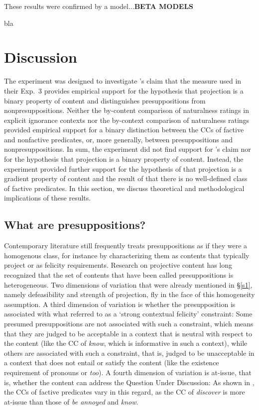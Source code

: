 \documentclass[11pt,fleqn]{article}
\newcommand{\6}{\mbox{$[\hspace*{-.6mm}[$}}
\newcommand{\9}{\mbox{$]\hspace*{-.6mm}]$}}
\newcommand{\citepos}[1]{\citeauthor{#1}'s \citeyear{#1}}
\begin{document}
These results were confirmed by a model...{\bf BETA MODELS}

\newpage

bla

\newpage

\section{Discussion}\label{s3}

The experiment was designed to investigate \citepos{mandelkern-etal2020} claim that the measure used in their Exp.~3 provides empirical support for the hypothesis that projection is a binary property of content and distinguishes presuppositions from nonpresuppositions. Neither the by-content comparison of naturalness ratings in explicit ignorance contexts nor the by-context comparison of naturalness ratings provided empirical support for a binary distinction between the CCs of factive and nonfactive predicates, or, more generally, between presuppositions and nonpresuppositions. In sum, the experiment did not find support for \citepos{mandelkern-etal2020} claim nor for the hypothesis that projection is a binary property of content. Instead, the experiment provided further support for the hypothesis of \citealt{tbd-variability} that projection is a gradient property of content and the result of \citealt{degen-tonhauser-language} that there is no well-defined class of factive predicates. In this section, we discuss theoretical and methodological implications of these results.

\subsection{What are presuppositions?}

Contemporary literature still frequently treats presuppositions as if they were a homogenous class, for instance by characterizing them as contents that typically project or as felicity requirements. Research on projective content has long recognized that the set of contents that have been called presuppositions is heterogeneous. Two dimensions of variation that were already mentioned in \S\ref{s1}, namely defeasibility and strength of projection, fly in the face of this homogeneity assumption.  A third dimension of variation is whether the presupposition is associated with what \citealt{brst-lang11} referred to as a `strong contextual felicity' constraint: Some presumed presuppositions are not associated with such a constraint, which means that they are judged to be acceptable in a context that is neutral with respect to the content (like the CC of {\em know}, which is informative in such a context), while others are associated with such a constraint, that is, judged to be unacceptable in a context that does not entail or satisfy the content (like the existence requirement of pronouns or {\em too}). A fourth dimension of variation is at-issue, that is, whether the content can address the Question Under Discussion: As shown in \citealt{tbd-variability}, the CCs of factive predicates vary in this regard, as the CC of {\em discover} is more at-issue than those of  {\em be annoyed} and {\em know}.
\end{document}
